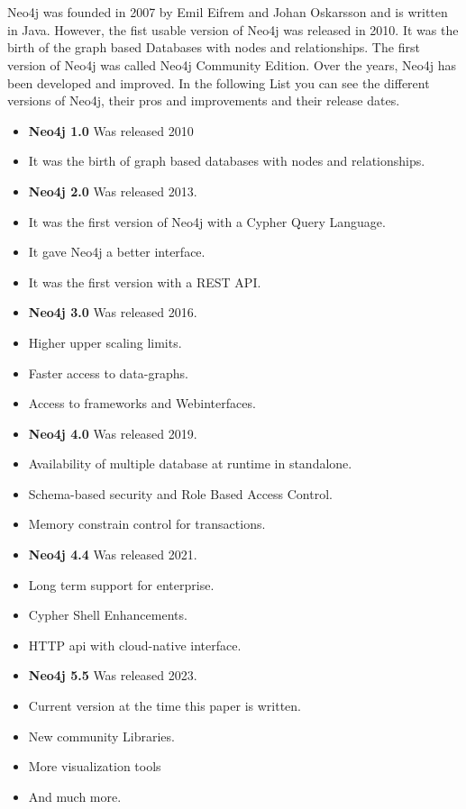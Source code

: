 
\section{} \label{sec:history}
Neo4j was founded in 2007 by Emil Eifrem and Johan Oskarsson and is written in Java.
However, the fist usable version of Neo4j was released in 2010.
It was the birth of the graph based Databases with nodes and relationships.
The first version of Neo4j was called Neo4j Community Edition.
Over the years, Neo4j has been developed and improved.
In the following List you can see the different versions of Neo4j, their pros and improvements and their release dates.
\begin{itemize}
    \item \textbf{Neo4j 1.0} Was released 2010
    \item It was the birth of graph based databases with nodes and relationships.
\end{itemize}
\begin{itemize}
    \item \textbf{Neo4j 2.0} Was released 2013.
    \item It was the first version of Neo4j with a Cypher Query Language.
    \item It gave Neo4j a better interface.
    \item It was the first version with a REST API.
\end{itemize}
\begin{itemize}
    \item \textbf{Neo4j 3.0} Was released 2016.
    \item Higher upper scaling limits.
    \item Faster access to data-graphs.
    \item Access to frameworks and Webinterfaces.
\end{itemize}
\begin{itemize}
    \item \textbf{Neo4j 4.0} Was released 2019.
    \item Availability of multiple database at runtime in standalone.
    \item Schema-based security and Role Based Access Control.
    \item Memory constrain control for transactions.
\end{itemize}
\begin{itemize}
    \item \textbf{Neo4j 4.4} Was released 2021.
    \item Long term support for enterprise.
    \item Cypher Shell Enhancements.
    \item HTTP api with cloud-native interface.
\end{itemize}
\begin{itemize}
    \item \textbf{Neo4j 5.5} Was released 2023.
    \item Current version at the time this paper is written.
    \item New community Libraries.
    \item More visualization tools
    \item And much more.
\end{itemize}